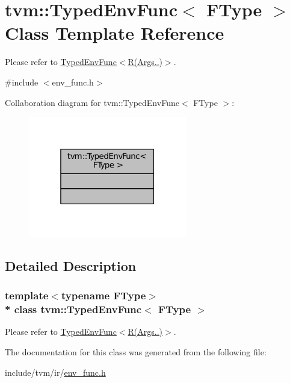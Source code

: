 \hypertarget{classtvm_1_1TypedEnvFunc}{}\section{tvm\+:\+:Typed\+Env\+Func$<$ F\+Type $>$ Class Template Reference}
\label{classtvm_1_1TypedEnvFunc}


Please refer to \hyperlink{classtvm_1_1TypedEnvFunc_3_01R_07Args_8_8_8_08_4_TypedEnvFuncAnchor}{Typed\+Env\+Func$<$R(Args..)$>$}.  




{\ttfamily \#include $<$env\+\_\+func.\+h$>$}



Collaboration diagram for tvm\+:\+:Typed\+Env\+Func$<$ F\+Type $>$\+:
\nopagebreak
\begin{figure}[H]
\begin{center}
\leavevmode
\includegraphics[width=196pt]{classtvm_1_1TypedEnvFunc__coll__graph}
\end{center}
\end{figure}


\subsection{Detailed Description}
\subsubsection*{template$<$typename F\+Type$>$\\*
class tvm\+::\+Typed\+Env\+Func$<$ F\+Type $>$}

Please refer to \hyperlink{classtvm_1_1TypedEnvFunc_3_01R_07Args_8_8_8_08_4_TypedEnvFuncAnchor}{Typed\+Env\+Func$<$R(Args..)$>$}. 

The documentation for this class was generated from the following file\+:\begin{DoxyCompactItemize}
\item 
include/tvm/ir/\hyperlink{env__func_8h}{env\+\_\+func.\+h}\end{DoxyCompactItemize}
